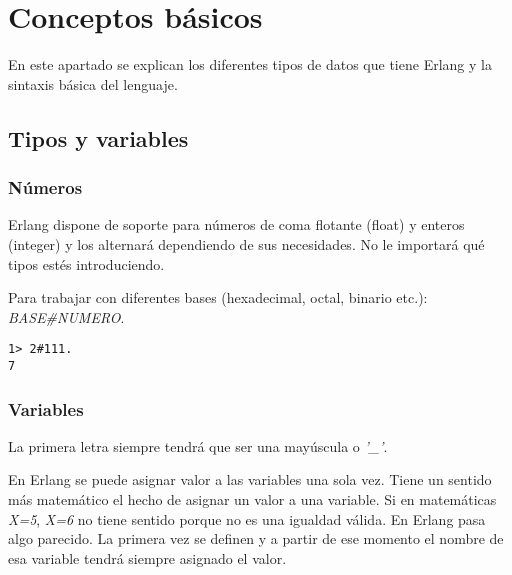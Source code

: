 
\section{Conceptos básicos}

En este apartado se explican los diferentes tipos de datos que tiene Erlang y la sintaxis básica del lenguaje.


\subsection{Tipos y variables}

\subsubsection{Números}

Erlang dispone de soporte para números de coma flotante (float) y enteros (integer) y los alternará
dependiendo de sus necesidades. No le importará qué tipos estés introduciendo.

Para trabajar con diferentes bases (hexadecimal, octal, binario etc.): \textit{BASE\#NUMERO}.
\begin{lstlisting}
1> 2#111.
7
\end{lstlisting}

\subsubsection{Variables}

La primera letra siempre tendrá que ser una mayúscula o \textit{'_'}.

En Erlang se puede asignar valor a las variables una sola vez. Tiene un sentido más matemático el hecho de
asignar un valor a una variable. Si en matemáticas \textit{X=5}, \textit{X=6} no tiene sentido porque no es
una igualdad válida. En Erlang pasa algo parecido. La primera vez se definen y a partir de ese momento el
nombre de esa variable tendrá siempre asignado el valor.

